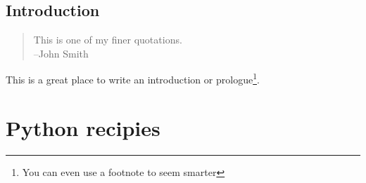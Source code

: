 \documentclass[11pt,fleqn]{book} %
\begin{document}



\chapter*{Introduction} %

\begin{quote}
This is one of my finer quotations.\\
--John Smith
\end{quote}

This is a great place to write an introduction or prologue\footnote{You can even use a footnote to seem smarter}.


\part{Python recipies}

\end{document}
